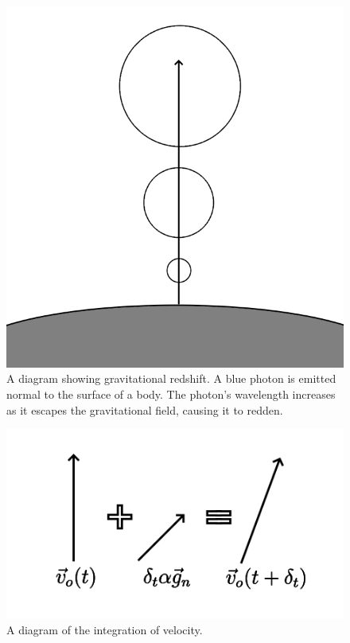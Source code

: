 \documentclass[12pt]{article}
\begin{document}
\begin{figure} 
\centering
\label{fig6}
  \includegraphics[width = 6 in]{redshift.png}
  \caption{
A diagram showing gravitational redshift.
A blue photon is emitted normal to the surface of a body.
The photon's wavelength increases as it escapes the gravitational field, causing it to redden.
}
\end{figure}

\begin{figure} 
\centering
\label{fig7}
  \includegraphics[width = 6 in]{velocity.png}
  \caption{
A diagram of the integration of velocity.
}
\end{figure}
\end{document}
